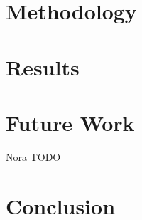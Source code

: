 \documentclass[sigconf,authordraft]{acmart}
\begin{document}
\section{Methodology}

\section{Results}

\section{Future Work}
Nora TODO
\section{Conclusion}

\begin{acks}

\end{acks}



\end{document}
